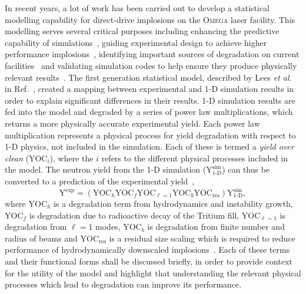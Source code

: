 In recent years, a lot of work has been carried out to develop a statistical modelling capability for direct-drive implosions on the \textsc{Omega} laser facility.
This modelling serves several critical purposes including enhancing the predictive capability of simulations~\cite{lees_experimentally_2021}, guiding experimental design to achieve higher performance implosions~\cite{gopalaswamy_tripled_2019}, identifying important sources of degradation on current facilities~\cite{lees_understanding_2023,gopalaswamy_using_2021} and validating simulation codes to help ensure they produce physically relevant results~\cite{ejaz_deep_2024}.
The first generation statistical model, described by Lees \textit{et al.} in Ref.~\cite{lees_experimentally_2021}, created a mapping between experimental and 1-D simulation results in order to explain significant differences in their results.
1-D simulation results are fed into the model and degraded by a series of power law multiplications, which returns a more physically accurate experimental yield.
Each power law multiplication represents a physical process for yield degradation with respect to 1-D physics, not included in the simulation.
Each of these is termed a \textit{yield over clean} ($\text{YOC}_i$), where the $i$ refers to the different physical processes included in the model.
The neutron yield from the 1-D simulation ($\text{Y}^{\text{sim}}_{1\text{-D}}$) can thus be converted to a prediction of the experimental yield~\cite{lees_experimentally_2021},
\begin{equation}
    \text{Y}^{\text{exp}} = \left( \text{YOC}_h \text{YOC}_f \text{YOC}_{\ell=1} \text{YOC}_b \text{YOC}_{\text{res}} \right) \text{Y}^{\text{sim}}_{1\text{-D}},
\end{equation}
where $\text{YOC}_h$ is a degradation term from hydrodynamics and instability growth, $\text{YOC}_f$ is degradation due to radioactive decay of the Tritium fill, $\text{YOC}_{\ell=1}$ is degradation from $\ell=1$ modes, $\text{YOC}_b$ is degradation from finite number and radius of beams and $\text{YOC}_{\text{res}}$ is a residual size scaling which is required to reduce performance of hydrodynamically downscaled implosions~\cite{thomas_quantifying_2020}.
Each of these terms and their functional forms shall be discussed briefly, in order to provide context for the utility of the model and highlight that understanding the relevant physical processes which lead to degradation can improve its performance.

